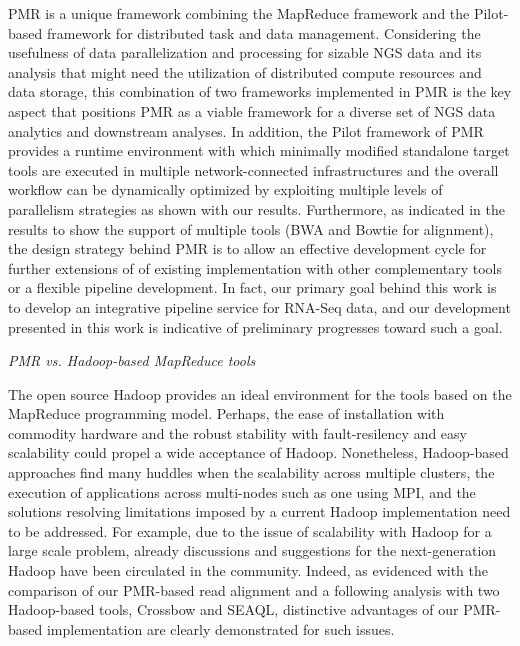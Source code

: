 \documentclass{acm_proc_article-sp}
\begin{document}
PMR is a unique framework combining the MapReduce framework and the Pilot-based framework for distributed task and data management\cite{pmr2012}.  Considering the usefulness of data parallelization and processing for sizable NGS data and its analysis that might need the utilization of distributed compute resources and data storage, this combination of two frameworks implemented in PMR is the key aspect that positions PMR as a viable framework for a diverse set of NGS data analytics and downstream analyses.  In addition, the Pilot framework of PMR provides a runtime environment with which minimally modified standalone target tools are executed in multiple network-connected infrastructures and the overall workflow can be dynamically optimized by exploiting multiple levels of parallelism strategies as shown with our results.    Furthermore, as indicated in the results to show the support of multiple tools (BWA and Bowtie for alignment), the design strategy behind PMR is to allow an effective development cycle for further extensions of of existing implementation with other complementary tools or a flexible pipeline development.  In fact, our primary goal behind this work is to develop an integrative pipeline service for RNA-Seq data, and our development presented in this work is indicative of preliminary progresses toward such a goal. 

\textit{PMR vs. Hadoop-based MapReduce tools}

The open source Hadoop provides an ideal environment for the tools
based on the MapReduce programming model.  Perhaps, the ease of
installation with commodity hardware and the robust stability with
fault-resilency and easy scalability could propel a wide acceptance of
Hadoop.  Nonetheless, Hadoop-based approaches find many huddles when
the scalability across multiple clusters\cite{weissman-mr-11}, the
execution of applications across multi-nodes such as one using MPI,
and the solutions resolving limitations imposed by a current Hadoop
implementation need to be addressed.  For example, due to the issue of
scalability with Hadoop for a large scale problem, already discussions
and suggestions for the next-generation Hadoop have been circulated in
the community\cite{ng-hadoop-url}.  Indeed, as evidenced with the
comparison of our PMR-based read alignment and a following analysis
with two Hadoop-based tools, Crossbow and SEAQL, distinctive
advantages of our PMR-based implementation are clearly demonstrated
for such issues.
\end{document}
